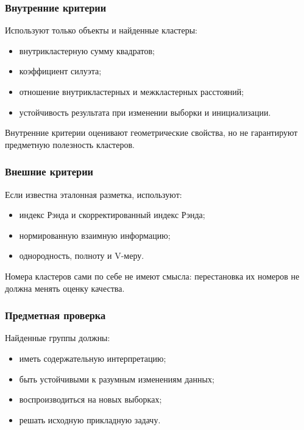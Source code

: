 \documentclass[12pt,a4paper]{article}
\theoremstyle{definition}
\theoremstyle{remark}
\begin{document}
\subsubsection{Внутренние критерии}

Используют только объекты и найденные кластеры:

\begin{itemize}
    \item внутрикластерную сумму квадратов;
    \item коэффициент силуэта;
    \item отношение внутрикластерных и межкластерных расстояний;
    \item устойчивость результата при изменении выборки и инициализации.
\end{itemize}

Внутренние критерии оценивают геометрические свойства, но не гарантируют
предметную полезность кластеров.

\subsubsection{Внешние критерии}

Если известна эталонная разметка, используют:

\begin{itemize}
    \item индекс Рэнда и скорректированный индекс Рэнда;
    \item нормированную взаимную информацию;
    \item однородность, полноту и V-меру.
\end{itemize}

Номера кластеров сами по себе не имеют смысла: перестановка их номеров не
должна менять оценку качества.

\subsubsection{Предметная проверка}

Найденные группы должны:

\begin{itemize}
    \item иметь содержательную интерпретацию;
    \item быть устойчивыми к разумным изменениям данных;
    \item воспроизводиться на новых выборках;
    \item решать исходную прикладную задачу.
\end{itemize}
\end{document}
